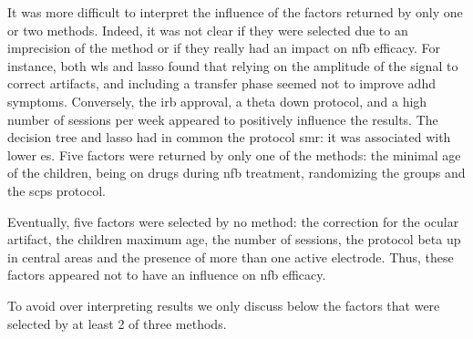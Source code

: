 It was more difficult to interpret the influence of the factors returned by only one or two methods. Indeed, it was not clear 
if they were selected due to an imprecision of the method or if they really had an impact on \gls{nfb} efficacy. For instance, 
both \gls{wls} and \gls{lasso} found that relying on the amplitude of the signal to correct artifacts, and including a transfer 
phase seemed not to improve \gls{adhd} symptoms. Conversely, the \gls{irb} approval, a theta down protocol, and a high number 
of sessions per week appeared to positively influence the results. The decision tree and \gls{lasso} had in common the protocol 
\gls{smr}: it was associated with lower \gls{es}. Five factors were returned by only one of the methods: the minimal age of the 
children, being on drugs during \gls{nfb} treatment, randomizing the groups and the \glspl{scp} protocol.  

Eventually, five factors were selected by no method: the correction for the ocular artifact, the children maximum age, the number 
of sessions, the protocol beta up in central areas and the presence of more than one active electrode. Thus, these factors appeared 
not to have an influence on \gls{nfb} efficacy.  

To avoid over interpreting results we only discuss below the factors that were selected by at least 2 of three methods. 

